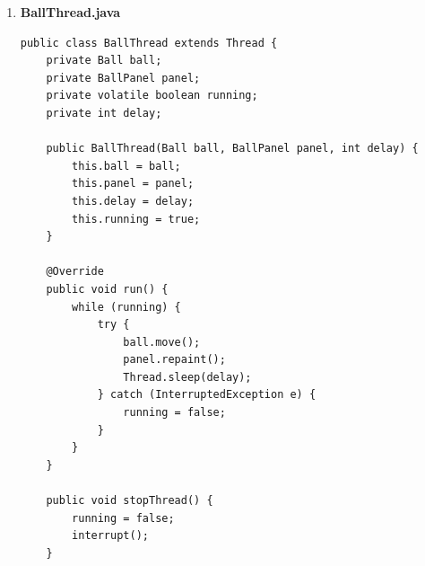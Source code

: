 \documentclass[a4paper]{article}
\begin{document}
\begin{enumerate}[itemsep=1em]
\begin{enumerate}[itemsep=1em]
\begin{verbatim}
public class Ball {
    private double x, y;
    private double dx, dy;
    private int radius;
    private Color color;
    private int panelWidth, panelHeight;

    public Ball(double x, double y, double dx, double dy, 
                int radius, Color color, 
                int panelWidth, int panelHeight) {
        this.x = x;
        this.y = y;
        this.dx = dx;
        this.dy = dy;
        this.radius = radius;
        this.color = color;
        this.panelWidth = panelWidth;
        this.panelHeight = panelHeight;
    }

    public void move() {
        x += dx;
        y += dy;

        if (x - radius < 0 || x + radius > panelWidth) {
            dx = -dx;
            if (x - radius < 0) x = radius;
            if (x + radius > panelWidth) 
                x = panelWidth - radius;
        }

        if (y - radius < 0 || y + radius > panelHeight) {
            dy = -dy;
            if (y - radius < 0) y = radius;
            if (y + radius > panelHeight) 
                y = panelHeight - radius;
        }
    }

    public void draw(Graphics g) {
        g.setColor(color);
        g.fillOval((int)(x - radius), (int)(y - radius), 
                   radius * 2, radius * 2);
    }

    public void updatePanelSize(int w, int h) {
        this.panelWidth = w;
        this.panelHeight = h;
    }
}
    \end{verbatim}
    \item \textbf{BallThread.java}
    \begin{verbatim}
public class BallThread extends Thread {
    private Ball ball;
    private BallPanel panel;
    private volatile boolean running;
    private int delay;

    public BallThread(Ball ball, BallPanel panel, int delay) {
        this.ball = ball;
        this.panel = panel;
        this.delay = delay;
        this.running = true;
    }

    @Override
    public void run() {
        while (running) {
            try {
                ball.move();
                panel.repaint();
                Thread.sleep(delay);
            } catch (InterruptedException e) {
                running = false;
            }
        }
    }

    public void stopThread() {
        running = false;
        interrupt();
    }


\end{verbatim}
\end{enumerate}
\end{enumerate}
\end{document}
